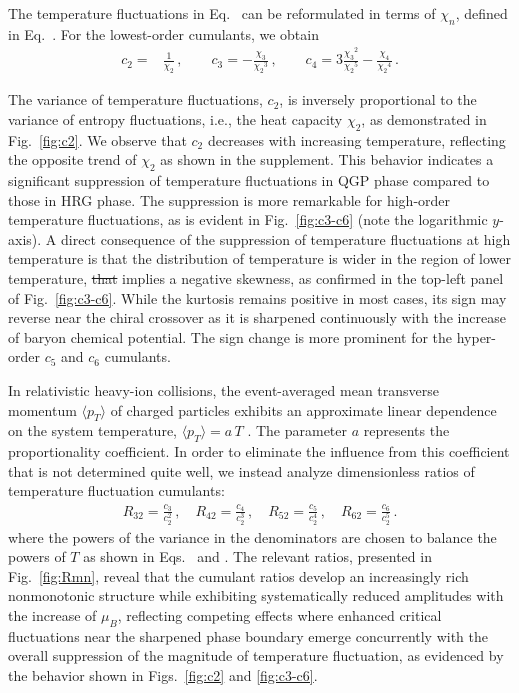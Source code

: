 \documentclass[aps,twocolumn,prd,superscriptaddress,nofootinbib,floatfix]{revtex4-2} %
\providecommand{\DIFaddtex}[1]{{\protect\color{blue}\uwave{#1}}} %
\providecommand{\DIFdeltex}[1]{{\protect\color{red}\sout{#1}}}                      %
\providecommand{\DIFaddbegin}{} %
\providecommand{\DIFaddend}{} %
\providecommand{\DIFdelbegin}{} %
\providecommand{\DIFdelend}{} %
\providecommand{\DIFadd}[1]{\texorpdfstring{\DIFaddtex{#1}}{#1}} %
\providecommand{\DIFdel}[1]{\texorpdfstring{\DIFdeltex{#1}}{}} %
\newcommand{\DIFscaledelfig}{0.5}
\newlength{\DIFdelgraphicswidth} %
\newlength{\DIFdelgraphicsheight} %
\newcommand{\DIFaddincludegraphics}[2][]{{\color{blue}\fbox{\DIFOincludegraphics[#1]{#2}}}} %
\newcommand{\DIFdelincludegraphics}[2][]{%
\sbox{\DIFdelgraphicsbox}{\DIFOincludegraphics[#1]{#2}}%
\settoboxwidth{\DIFdelgraphicswidth}{\DIFdelgraphicsbox} %
\settoboxtotalheight{\DIFdelgraphicsheight}{\DIFdelgraphicsbox} %
\scalebox{\DIFscaledelfig}{%
\parbox[b]{\DIFdelgraphicswidth}{\usebox{\DIFdelgraphicsbox}\\[-\baselineskip] \rule{\DIFdelgraphicswidth}{0em}}\llap{\resizebox{\DIFdelgraphicswidth}{\DIFdelgraphicsheight}{%
\setlength{\unitlength}{\DIFdelgraphicswidth}%
\begin{picture}(1,1)%
\thicklines\linethickness{2pt} %
{\color[rgb]{1,0,0}\put(0,0){\framebox(1,1){}}}%
{\color[rgb]{1,0,0}\put(0,0){\line( 1,1){1}}}%
{\color[rgb]{1,0,0}\put(0,1){\line(1,-1){1}}}%
\end{picture}%
}\hspace*{3pt}}} %
} %
\DeclareRobustCommand{\DIFaddbegin}{\DIFOaddbegin \let\includegraphics\DIFaddincludegraphics} %
\DeclareRobustCommand{\DIFaddend}{\DIFOaddend \let\includegraphics\DIFOincludegraphics} %
\DeclareRobustCommand{\DIFdelbegin}{\DIFOdelbegin \let\includegraphics\DIFdelincludegraphics} %
\DeclareRobustCommand{\DIFdelend}{\DIFOaddend \let\includegraphics\DIFOincludegraphics} %
\begin{document}
The temperature fluctuations in Eq.~ can be reformulated in terms of $\chi_n$, defined in Eq.~. For the lowest-order cumulants, we obtain
\begin{align}
    c_2=&\frac{1}{\chi_2}\,, \qquad c_3=-\frac{\chi_3}{{\chi_2}^3}\,, \qquad c_4=3\frac{{\chi_3}^2}{{\chi_2}^5}-\frac{\chi_4}{{\chi_2}^4}\,. \label{}
\end{align}

The variance of temperature fluctuations, $c_2$, is inversely proportional to the variance of entropy fluctuations, i.e., the heat capacity $\chi_2$, as demonstrated in Fig.~\ref{fig:c2}. We observe that $c_2$ decreases with increasing temperature, reflecting the opposite trend of $\chi_2$ as shown in the supplement. This behavior indicates a significant suppression of temperature fluctuations in QGP phase compared to those in HRG phase. The suppression is more remarkable for high-order temperature fluctuations, as is evident in Fig.~\ref{fig:c3-c6} 
(note the logarithmic $y$-axis). A direct consequence of the suppression of temperature fluctuations at high temperature is that the distribution of temperature is wider in the region of lower temperature, \DIFdelbegin \DIFdel{that }\DIFdelend \DIFaddbegin \DIFadd{which }\DIFaddend implies a negative skewness, as confirmed in the top-left panel of Fig.~\ref{fig:c3-c6}. While the kurtosis remains positive in most cases, its sign may reverse near the chiral crossover as it is sharpened continuously with the increase of baryon chemical potential. The sign change is more prominent for the hyper-order $c_5$ and $c_6$ cumulants.

In relativistic heavy-ion collisions, the event-averaged mean transverse momentum $\langle p_{T} \rangle$ of charged particles exhibits an approximate linear dependence on the system temperature, $\langle p_{T} \rangle = a\,T$ \cite{Gardim:2019xjs, Gardim:2019brr, Giacalone:2020lbm, Gardim:2024zvi}. The parameter $a$ represents the proportionality coefficient. In order to eliminate the influence from this coefficient that is not determined quite well, we instead analyze dimensionless ratios of temperature fluctuation cumulants: 
\begin{align}
    R_{32}=\frac{c_3}{c_2^2}\,, \quad R_{42}=\frac{c_4}{c_2^3}\,,\quad R_{52}=\frac{c_5}{c_2^4}\,,\quad R_{62}=\frac{c_6}{c_2^5}\,.\label{eq:R32R42}
\end{align}
where the powers of the variance in the denominators are chosen to balance the powers of $T$ as shown in Eqs.~ and . The relevant ratios, presented in Fig.~\ref{fig:Rmn}, reveal that the cumulant ratios develop an increasingly rich nonmonotonic structure while exhibiting systematically reduced amplitudes with the increase of $\mu_B$, reflecting competing effects where enhanced critical fluctuations near the sharpened phase boundary emerge concurrently with the overall suppression of the magnitude of temperature fluctuation, as evidenced by the behavior shown in Figs.~\ref{fig:c2} and \ref{fig:c3-c6}. 
\end{document}
